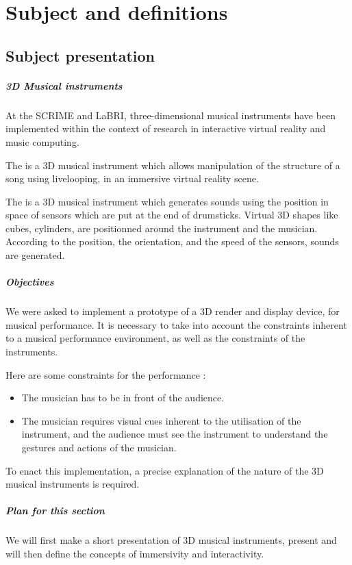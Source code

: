 \chapter{Subject and definitions}
\section{Subject presentation}
\paragraph{3D Musical instruments}
At the \ac{SCRIME} and \ac{LaBRI}, three-dimensional musical instruments have been implemented within the context of research in interactive virtual reality and music computing. 

The  \cite{berthaut2010drile} is a 3D musical instrument which allows manipulation of the structure of a song using \gls{livelooping}, in an immersive virtual reality scene.

The  is a 3D musical instrument which generates sounds using the position in space of sensors which are put at the end of drumsticks. Virtual 3D shapes like cubes, cylinders, are positionned around the instrument and the musician. According to the position, the orientation, and the speed of the sensors, sounds are generated.

\paragraph{Objectives}
We were asked to implement a prototype of a 3D render and display device, for musical performance.
It is necessary to take into account the constraints inherent to a musical performance environment, as well as the constraints of the instruments.

Here are some constraints for the performance : 
\begin{itemize}
\item The musician has to be in front of the audience.
\item The musician requires visual cues inherent to the utilisation of the instrument, and the audience must see the instrument to understand the gestures and actions of the musician.
\end{itemize}

To enact this implementation, a precise explanation of the nature of the 3D musical instruments is required.

\paragraph{Plan for this section}
We will first make a short presentation of 3D musical instruments, present and will then define the concepts of immersivity and interactivity.

